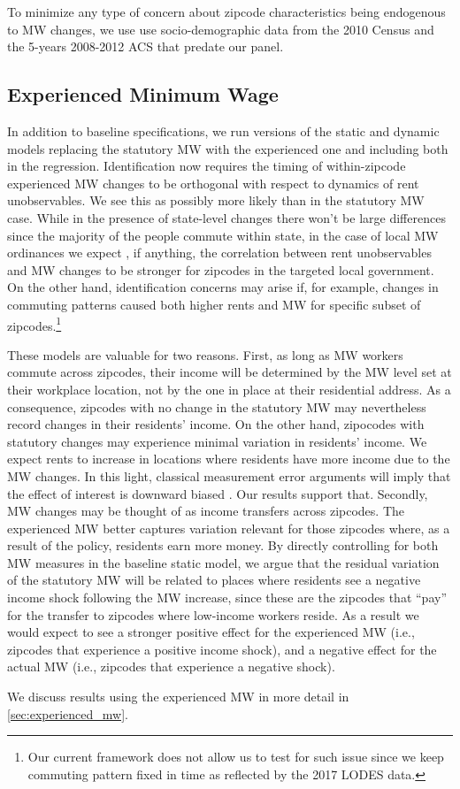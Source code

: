 To minimize any type of concern about zipcode characteristics being endogenous to MW changes, 
we use use socio-demographic data from the 2010 Census and the 5-years 2008-2012 ACS that 
predate our panel.


\subsection{Experienced Minimum Wage}\label{sec:emp_strategy_expmw}

In addition to baseline specifications, we run versions of the static and dynamic models 
replacing the statutory MW with the experienced one and including both in 
the regression. Identification now requires the timing of within-zipcode 
experienced MW changes to be orthogonal with respect to dynamics of rent
unobservables. We see this as possibly more likely than in the statutory MW case. 
While in the presence of state-level changes there won't be large differences since the
majority of the people commute within state, in the case of local MW ordinances we expect 
, if anything, the correlation between rent unobservables and MW changes to be stronger for
zipcodes in the targeted local government. On the other hand, identification concerns may arise 
if, for example, changes in commuting patterns caused both higher rents and MW for specific 
subset of zipcodes.\footnote{Our current framework does not allow us to test for such issue
since we keep commuting pattern fixed in time as reflected by the 2017 LODES data.}

These models are valuable for two reasons. First, as long as MW workers commute across zipcodes, 
their income will be determined by the 
MW level set at their workplace location, not by the one in place at their residential address.
As a consequence, zipcodes with no change in 
the statutory MW may nevertheless record changes in their residents' income. On the other hand, 
zipocodes with statutory changes may experience minimal variation in residents' income. 
We expect rents to increase in locations where residents have more income due to the MW 
changes. In this light, classical measurement error arguments will imply that the effect of interest 
is downward biased \parencite{AngristPischke2009}. Our results support that.  Secondly, 
MW changes may be thought of as income transfers across zipcodes. 
The experienced MW better captures variation relevant for those zipcodes 
where, as a result of the policy, residents earn more money. 
By directly controlling for both MW measures in the baseline static model, 
we argue that the residual variation of the statutory MW will be related to places where 
residents see a negative income shock following the MW increase, since these are the 
zipcodes that ``pay'' for the transfer to zipcodes where low-income workers reside. 
As a result we would expect to see a stronger positive effect for the experienced MW 
(i.e., zipcodes that experience a positive income shock), and a negative effect for 
the actual MW (i.e., zipcodes that experience a negative shock).

We discuss results using the experienced MW in more detail in \autoref{sec:experienced_mw}.



